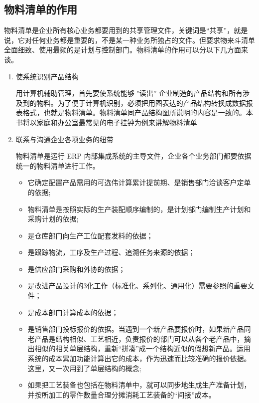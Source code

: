\subsection {物料清单的作用}

    物料清单是企业所有核心业务都要用到的共享管理文件，关键词是“共享”，就是说，它对任何业务都是重要的，不是某一种业务所独占的文件。但要求物来斗清单全面细致、使用最频的是计划与控制部门。物料清单的作用可以分以下几方面来谈。

    \begin{enumerate}
    \item 使系统识别产品结构

        用计算机辅助管理，首先要使系统能够 "读出” 企业制造的产品结构和所有涉及到的物料。为了便于计算机识别，必须把用图表达的产品结构转换成数据报表格式，也就是物料清单。物料清单同产品结构图所说明的内容是一致的。本书将以家庭和办公室最常见的电子挂钟为例来讲解物料清单

    \item 联系与沟通企业各项业务的纽带

        物料清单是运行 ERP 内部集成系统的主导文件，企业各个业务部门都要依据统一的物料清单进行工作。

        \begin{itemize}
        \item 它确定配置产品需用的可选伟计算累计提前期、是销售部门洽谈客户定单的依据;

        \item 物料清单是按照实际的生产装配顺序编制的，是计划部门编制生产计划和采购计划的依据;

        \item 是仓库部门向生产工位配套发料的依据；

        \item 是跟踪物流，工序及生产过程、追溯任务来源的依据；

        \item 是供应部门采购和外协的依据；

        \item 是改进产品设计的3化工作（标准化、系列化、通用化）需要参照的重要文件；

        \item 是成本部门计算成本的依据；

        \item 是销售部门投标报价的依据。当遇到一个新产品要报价时，如果新产品同老产品是结构相似、工艺相近，负责报价的部门可以从各个老产品中，摘出相似的相关单层结构，重新“拼凑”成一个结构近似的假想新产品。运用系统的成本累加功能计算出它的成本，作为迅速而比较准确的报价依据。这里，又一次用到了单层结构的概念;

        \item 如果把工艺装备也包括在物料清单中，就可以同步地生成生产准备计划，并按所加工的零件数量合理分摊消耗工艺装备的“间接”成本。
        \end{itemize}
    \end{enumerate}

